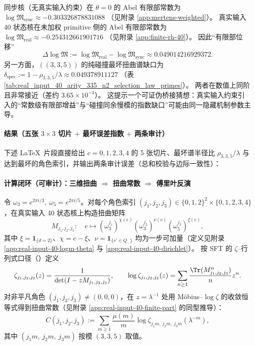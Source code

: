 \begin{remark}\label{rem:arity-335-logm-gap-bridge}
同步核（无真实输入约束）在 \(\theta=0\) 的 Abel 有限部常数为
\(
\log\mathfrak{M}_{\mathrm{sync}}\approx -0.303326878831088
\)
（见附录 \ref{app:mertens-weighted}）。
真实输入 \(40\) 状态核在未加权 primitive 侧的 Abel 有限部常数为
\(
\log\mathfrak{M}_{\mathrm{real}}\approx -0.254312661901716
\)
（见附录 \ref{app:finite-rh-40}）。
因此“有限部位移”
\[
\Delta\log\mathfrak{M}:=\log\mathfrak{M}_{\mathrm{real}}-\log\mathfrak{M}_{\mathrm{sync}}
\approx 0.049014216929372.
\]
另一方面，\(((3,3,5))\) 的纯碰撞最坏扭曲谱缺口为
\(
\delta_{\mathrm{spec}}:=1-\rho_{3,3,5}/\lambda\approx 0.049378911127
\)
（表 \ref{tab:real_input_40_arity_335_n2_selection_law_primes}）。
两者在数值上同阶且非常接近（差约 \(3.65\times 10^{-4}\)）。
这提示一个可证伪桥接猜想：真实输入约束引入的“常数级有限部增益”与“碰撞同余慢模的指数缺口”可能由同一隐藏机制参数主导。
\end{remark}

\paragraph{结果（五张 \texorpdfstring{$3\times 3$}{3x3} 切片 \texorpdfstring{$+$}{+} 最坏误差指数 \texorpdfstring{$+$}{+} 两条审计）}
下述 \LaTeX\ 片段直接给出 $c=0,1,2,3,4$ 的 5 张切片、最坏谱半径比 $\rho_{3,3,5}/\lambda$ 与达到最坏的角色索引，并输出两条审计误差（总和校验与边际一致性）：
\paragraph{计算闭环（可审计）：三维扭曲 $\Rightarrow$ 扭曲常数 $\Rightarrow$ 傅里叶反演}
令 $\omega_3=e^{2\pi i/3},\ \omega_5=e^{2\pi i/5}$。对每个角色索引 $(j_1,j_2,j_3)\in\{0,1,2\}^2\times\{0,1,2,3,4\}$，在真实输入 40 状态核上构造扭曲矩阵
$$
M_{j_1,j_2,j_3}:\quad
e\mapsto (\omega_3^{j_1})^{\chi(e)}(\omega_3^{j_2})^{\nu(e)}(\omega_5^{j_3})^{\xi(e)},
$$
其中 $\xi=\mathbf{1}_{\{d=2\}}$、$\chi=e-\xi$、$\nu=\mathbf{1}_{\{s'\in Q_-\}}$ 均为一步可加量（定义见附录 \ref{app:real-input-40-logm-theta} 与 \ref{app:real-input-40-dirichlet}）。
按 SFT 的 $\zeta$--行列式口径（\cite{BrinStuck2002}）定义
$$
\zeta_{j_1,j_2,j_3}(z)=\frac{1}{\det(I-zM_{j_1,j_2,j_3})},
\qquad
\log\zeta_{j_1,j_2,j_3}(z)=\sum_{n\ge 1}\frac{\Tr(M_{j_1,j_2,j_3}^n)}{n}z^n.
$$
对非平凡角色 $(j_1,j_2,j_3)\neq(0,0,0)$，在 $z=\lambda^{-1}$ 处用 Möbius--$\log\zeta$ 的收敛恒等式得到扭曲常数（见附录 \ref{app:real-input-40-finite-part} 的同型推导）：
$$
C(j_1,j_2,j_3):=\sum_{m\ge 1}\frac{\mu(m)}{m}\log\zeta_{j_1m,\ j_2m,\ j_3m}(\lambda^{-m}),
$$
其中 $(j_1m,\ j_2m,\ j_3m)$ 按模 $(3,3,5)$ 取值。

